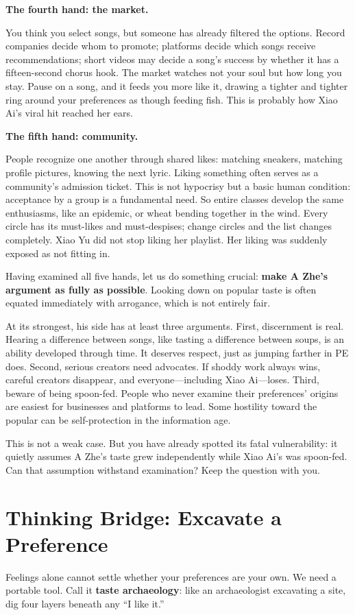 \textbf{The fourth hand: the market.}

You think you select songs, but someone has already filtered the options. Record companies decide whom to promote; platforms decide which songs receive recommendations; short videos may decide a song's success by whether it has a fifteen-second chorus hook. The market watches not your soul but how long you stay. Pause on a song, and it feeds you more like it, drawing a tighter and tighter ring around your preferences as though feeding fish. This is probably how Xiao Ai's viral hit reached her ears.

\textbf{The fifth hand: community.}

People recognize one another through shared likes: matching sneakers, matching profile pictures, knowing the next lyric. Liking something often serves as a community's admission ticket. This is not hypocrisy but a basic human condition: acceptance by a group is a fundamental need. So entire classes develop the same enthusiasms, like an epidemic, or wheat bending together in the wind. Every circle has its must-likes and must-despises; change circles and the list changes completely. Xiao Yu did not stop liking her playlist. Her liking was suddenly exposed as not fitting in.

Having examined all five hands, let us do something crucial: \textbf{make A Zhe's argument as fully as possible}. Looking down on popular taste is often equated immediately with arrogance, which is not entirely fair.

At its strongest, his side has at least three arguments. First, discernment is real. Hearing a difference between songs, like tasting a difference between soups, is an ability developed through time. It deserves respect, just as jumping farther in PE does. Second, serious creators need advocates. If shoddy work always wins, careful creators disappear, and everyone---including Xiao Ai---loses. Third, beware of being spoon-fed. People who never examine their preferences' origins are easiest for businesses and platforms to lead. Some hostility toward the popular can be self-protection in the information age.

This is not a weak case. But you have already spotted its fatal vulnerability: it quietly assumes A Zhe's taste grew independently while Xiao Ai's was spoon-fed. Can that assumption withstand examination? Keep the question with you.

\section{Thinking Bridge: Excavate a Preference}
Feelings alone cannot settle whether your preferences are your own. We need a portable tool. Call it \textbf{taste archaeology}: like an archaeologist excavating a site, dig four layers beneath any ``I like it.''

